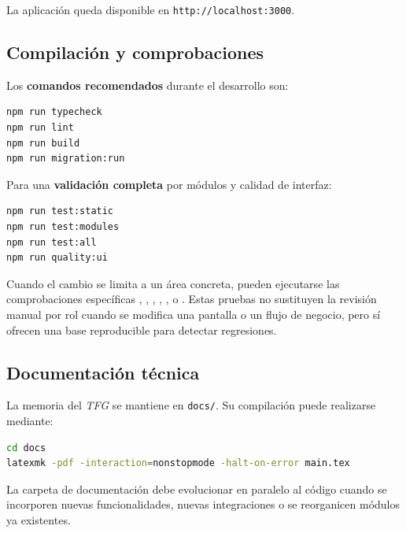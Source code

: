 La aplicación queda disponible en \texttt{http://localhost:3000}.

\subsection{Compilación y comprobaciones}

Los \textbf{comandos recomendados} durante el desarrollo son:

\begin{lstlisting}[language=bash]
npm run typecheck
npm run lint
npm run build
npm run migration:run
\end{lstlisting}

Para una \textbf{validación completa} por módulos y calidad de interfaz:

\begin{lstlisting}[language=bash]
npm run test:static
npm run test:modules
npm run test:all
npm run quality:ui
\end{lstlisting}

Cuando el cambio se limita a un área concreta, pueden ejecutarse las comprobaciones específicas , , , , ,  o . Estas pruebas no sustituyen la revisión manual por rol cuando se modifica una pantalla o un flujo de negocio, pero sí ofrecen una base reproducible para detectar regresiones.

\subsection{Documentación técnica}

La memoria del \textit{TFG} se mantiene en \texttt{docs/}. Su compilación puede realizarse mediante:

\begin{lstlisting}[language=bash]
cd docs
latexmk -pdf -interaction=nonstopmode -halt-on-error main.tex
\end{lstlisting}

La carpeta de documentación debe evolucionar en paralelo al código cuando se incorporen nuevas funcionalidades, nuevas integraciones o se reorganicen módulos ya existentes.
